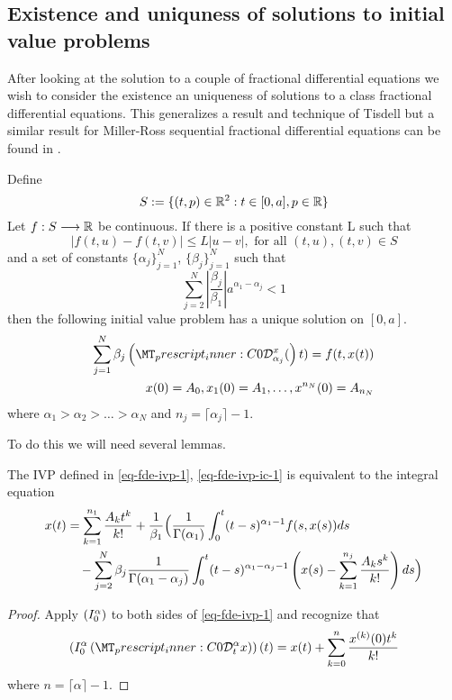 \subsection{Existence and uniquness of solutions to initial value problems}
\label{sec:existence_uniq}
After looking at the solution to a couple of fractional differential equations 
we wish to consider the existence an uniqueness of solutions to a class fractional differential equations. 
This generalizes a result and technique of Tisdell \cite{Tisdell2012} but a similar result for Miller-Ross sequential
fractional differential equations can be found in \cite{Podlubny1999}.


\begin{theorem}[Uniqueness]
\label{thm-existence-uniq}
	Define
		$$ S:= \{ (t,p) \in \mathbb{R}^2 : t \in [0, a], p \in \mathbb{R} \} $$
	Let $ f : S \longrightarrow \mathbb{R} $ be continuous. If there is a positive constant L such that 
		$$ |f(t,u) - f(t,v)| \leq L|u-v|, \text{ for all } (t,u), (t,v) \in S $$
	and a set of constants $ \{ \alpha_j \}_{j = 1}^{N} $, $ \{ \beta_j \}_{j=1}^N $
	such that
	$$
		\sum_{j=2}^N \left|\frac{\beta_j}{\beta_1}\right| a^{\alpha_1 - \alpha_j} < 1
	$$
	then the following initial value problem has a unique solution on $ [0, a] $.
	\begin{align}
		\label{eq-fde-ivp-1}
		\sum_{j=1}^{N} \beta_j\capder{0}{\alpha_j}{x}(t) = f(t,x(t)) \\
		\label{eq-fde-ivp-ic-1}
		x(0) = A_0, x_1(0) = A_1, \ldots, x^{n_N}(0) = A_{n_N}
	\end{align}
	where $ \alpha_1 > \alpha_2 > \ldots > \alpha_N $
	and $ n_j = \lceil \alpha_j \rceil - 1 $.
\end{theorem}
To do this we will need several lemmas. 

\begin{lemma}
	The IVP defined in \eqref{eq-fde-ivp-1}, \eqref{eq-fde-ivp-ic-1} is equivalent to the integral equation
	\begin{align*}
		x(t) &= \sum_{k=1}^{n_1}\frac{A_kt^k}{k!} + \frac{1}{\beta_1} \Bigl( \frac{1}{\Gamma(\alpha_1)}\int_{0}^{t} (t-s)^{\alpha_1 - 1}f(s,x(s))ds \\
			& \ \ \ - \sum_{j=2}^{N}\beta_j \frac{1}{\Gamma(\alpha_1 - \alpha_j)}
			\int_{0}^{t}(t-s)^{\alpha_1 - \alpha_j - 1}\left(x(s) - \sum_{k=1}^{n_j}\frac{A_ks^k}{k!} \right) ds \Bigr)
	\end{align*}
\end{lemma}
\begin{proof}
	Apply $ \left( I_{0}^{\alpha}  \right) $ to both sides of \eqref{eq-fde-ivp-1} and recognize that
	$$
		\rli{0}{\alpha}{\capder{0}{t}{\alpha}{x}}(t) = x(t) + \sum_{k=0}^{n} \frac{x^{(k)}(0)t^{k}}{k!}
	$$
	where $ n = \lceil \alpha \rceil - 1 $.
\end{proof}


